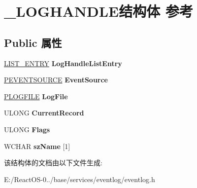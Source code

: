 \hypertarget{struct___l_o_g_h_a_n_d_l_e}{}\section{\+\_\+\+L\+O\+G\+H\+A\+N\+D\+L\+E结构体 参考}
\label{struct___l_o_g_h_a_n_d_l_e}
\subsection*{Public 属性}
\begin{DoxyCompactItemize}
\item 
\mbox{\label{struct___l_o_g_h_a_n_d_l_e_a74cfc6b3f8e52fe0f2bb2f6365526105}} 
\hyperlink{struct___l_i_s_t___e_n_t_r_y}{L\+I\+S\+T\+\_\+\+E\+N\+T\+RY} {\bfseries Log\+Handle\+List\+Entry}
\item 
\mbox{\label{struct___l_o_g_h_a_n_d_l_e_af12f9624de2168f5e87d1bf0fadcc54f}} 
\hyperlink{struct___e_v_e_n_t_s_o_u_r_c_e}{P\+E\+V\+E\+N\+T\+S\+O\+U\+R\+CE} {\bfseries Event\+Source}
\item 
\mbox{\label{struct___l_o_g_h_a_n_d_l_e_a43b2a35e9df82e41f1c2ed567cca4da5}} 
\hyperlink{struct___l_o_g_f_i_l_e}{P\+L\+O\+G\+F\+I\+LE} {\bfseries Log\+File}
\item 
\mbox{\label{struct___l_o_g_h_a_n_d_l_e_a1f51d130a45bd88c5fd6f061d5ed0334}} 
U\+L\+O\+NG {\bfseries Current\+Record}
\item 
\mbox{\label{struct___l_o_g_h_a_n_d_l_e_a7bbd4ebb46180c11762e80857c6141d0}} 
U\+L\+O\+NG {\bfseries Flags}
\item 
\mbox{\label{struct___l_o_g_h_a_n_d_l_e_ac560733e9c586d53c9e0049f73a6fd7e}} 
W\+C\+H\+AR {\bfseries sz\+Name} \mbox{[}1\mbox{]}
\end{DoxyCompactItemize}


该结构体的文档由以下文件生成\+:\begin{DoxyCompactItemize}
\item 
E\+:/\+React\+O\+S-\/0../base/services/eventlog/eventlog.\+h\end{DoxyCompactItemize}
